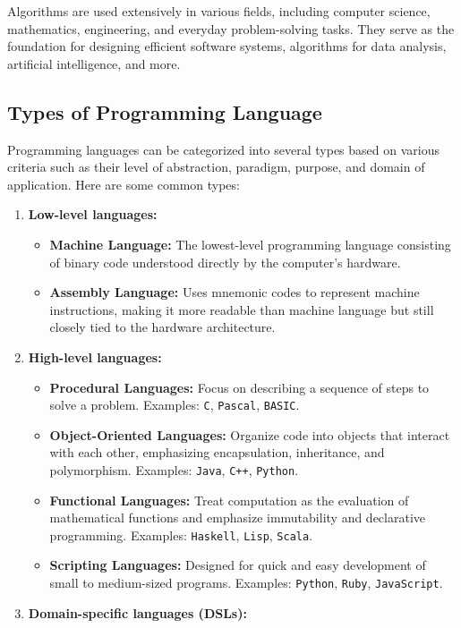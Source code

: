 Algorithms are used extensively in various fields, including computer science, mathematics, engineering, and everyday problem-solving tasks. They serve as the foundation for designing efficient software systems, algorithms for data analysis, artificial intelligence, and more.

\subsection{Types of Programming Language}
Programming languages can be categorized into several types based on various criteria such as their level of abstraction, paradigm, purpose, and domain of application. Here are some common types:

\begin{enumerate}
    \item \textbf{Low-level languages:}
    \begin{itemize}
        \item \textbf{Machine Language:} The lowest-level programming language consisting of binary code understood directly by the computer’s hardware.
        \item \textbf{Assembly Language:} Uses mnemonic codes to represent machine instructions, making it more readable than machine language but still closely tied to the hardware architecture.
    \end{itemize}
    \item \textbf{High-level languages:}
    \begin{itemize}
        \item \textbf{Procedural Languages:} Focus on describing a sequence of steps to solve a problem. Examples: \texttt{C}, \texttt{Pascal}, \texttt{BASIC}.
        \item \textbf{Object-Oriented Languages:} Organize code into objects that interact with each other, emphasizing encapsulation, inheritance, and polymorphism. Examples: \texttt{Java}, \texttt{C++}, \texttt{Python}.
        \item \textbf{Functional Languages:} Treat computation as the evaluation of mathematical functions and emphasize immutability and declarative programming. Examples: \texttt{Haskell}, \texttt{Lisp}, \texttt{Scala}.
        \item \textbf{Scripting Languages:} Designed for quick and easy development of small to medium-sized programs. Examples: \texttt{Python}, \texttt{Ruby}, \texttt{JavaScript}.
    \end{itemize}
    \item \textbf{Domain-specific languages (DSLs):}

\end{enumerate}
